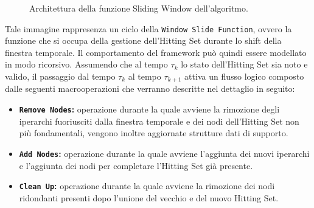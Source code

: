 \begin{figure}[htbp]
\caption{Architettura della funzione Sliding Window dell'algoritmo.}\label{fig:sliding_window_architecture}
\end{figure}

Tale immagine rappresenza un ciclo della \texttt{Window Slide Function}, ovvero la funzione che si occupa della gestione dell'Hitting Set durante lo shift della finestra temporale.
Il comportamento del framework può quindi essere modellato in modo ricorsivo.
Assumendo che al tempo $\tau_k$ lo stato dell'Hitting Set sia noto e valido, il passaggio dal tempo $\tau_k$ al tempo $\tau_{k+1}$ attiva un flusso logico composto dalle seguenti macrooperazioni che verranno descritte nel dettaglio in seguito:
\begin{itemize}
    \item \textbf{\texttt{Remove Nodes}:} operazione durante la quale avviene la rimozione degli iperarchi fuoriusciti dalla finestra temporale e dei nodi dell'Hitting Set non più fondamentali, vengono inoltre aggiornate strutture dati di supporto.
    \item \textbf{\texttt{Add Nodes}:} operazione durante la quale avviene l'aggiunta dei nuovi iperarchi e l'aggiunta dei nodi per completare l'Hitting Set già presente.
    \item \textbf{\texttt{Clean Up}:} operazione durante la quale avviene la rimozione dei nodi ridondanti presenti dopo l'unione del vecchio e del nuovo Hitting Set.
\end{itemize}

